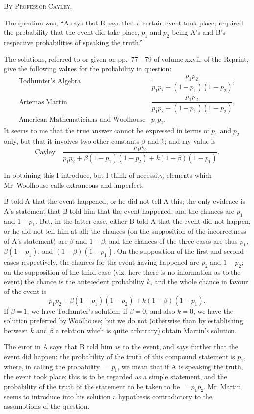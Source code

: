 \documentclass[11pt,a4paper]{article}
\theoremstyle{definition}
\begin{document}
\begin{center}\textsc{By Professor Cayley.}\end{center}

The question was, ``A says that B says that a certain event took place; required the probability that the event did take place, $p_1$ and $p_2$ being A's and B's respective probabilities of speaking the truth.''

The solutions, referred to or given on pp.~77---79 of volume xxvii. of the Reprint, give the following values for the probability in question:
\[
\begin{array}{ll}
\text{Todhunter's Algebra} & \dfrac{p_1p_2}{p_1p_2 + (1-p_1)(1-p_2)}, \\[1.5ex]
\text{Artemas Martin} & \dfrac{p_1p_2}{p_1p_2 + (1-p_1)(1-p_2)}, \\[1.5ex]
\text{American Mathematicians and Woolhouse} & p_1p_2.
\end{array}
\]
It seems to me that the true answer cannot be expressed in terms of $p_1$ and $p_2$ only, but that it involves two other constants $\beta$ and $k$; and my value is
\[
\text{Cayley} \quad \frac{p_1p_2}{p_1p_2 + \beta(1-p_1)(1-p_2) + k(1-\beta)(1-p_1)}.
\]

In obtaining this I introduce, but I think of necessity, elements which Mr~Woolhouse calls extraneous and imperfect.

B told A that the event happened, or he did not tell A this; the only evidence is A's statement that B told him that the event happened; and the chances are $p_1$ and $1-p_1$. But, in the latter case, either B told A that the event did not happen, or he did not tell him at all; the chances (on the supposition of the incorrectness of A's statement) are $\beta$ and $1-\beta$; and the chances of the three cases are thus $p_1$, $\beta(1-p_1)$, and $(1-\beta)(1-p_1)$. On the supposition of the first and second cases respectively, the chances for the event having happened are $p_2$ and $1-p_2$; on the supposition of the third case (viz. here there is no information as to the event) the chance is the antecedent probability $k$, and the whole chance in favour of the event is
\[
p_1p_2 + \beta(1-p_1)(1-p_2) + k(1-\beta)(1-p_1).
\]
If $\beta = 1$, we have Todhunter's solution; if $\beta = 0$, and also $k=0$, we have the solution preferred by Woolhouse; but we do not (otherwise than by establishing between $k$ and $\beta$ a relation which is quite arbitrary) obtain Martin's solution.

The error in A says that B told him as to the event, and says further that the event did happen: the probability of the truth of this compound statement is $p_1$, where, in calling the probability $=p_1$, we mean that if A is speaking the truth, the event took place; this is to be regarded as a simple statement, and the probability of the truth of the statement to be taken to be $=p_1p_2$. Mr~Martin seems to introduce into his solution a hypothesis contradictory to the assumptions of the question.
\end{document}
